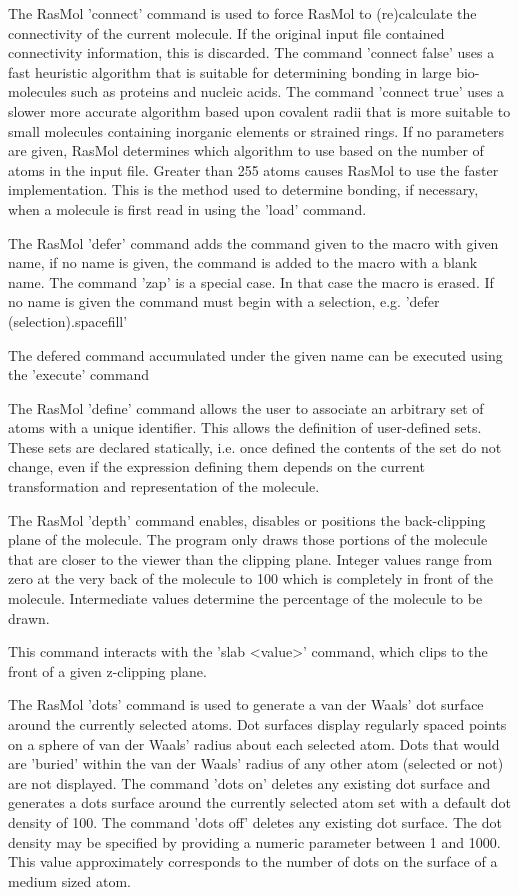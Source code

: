 The RasMol
'connect'
command is used to force RasMol to (re)calculate the connectivity
of the current molecule.
If the original input file contained connectivity information, this
is discarded. The command
'connect false'
uses a fast heuristic
algorithm that is suitable for determining bonding in large
bio-molecules such as proteins and nucleic acids. The command
'connect true'
uses a slower more accurate algorithm based upon
covalent radii that is more suitable to small molecules containing
inorganic elements or strained rings. If no parameters are given,
RasMol determines which algorithm to use based on the number of atoms
in the input file. Greater than 255 atoms causes RasMol to use the
faster implementation. This is the method used to determine bonding,
if necessary, when a molecule is first read in using the
'load'
command.

The RasMol
'defer'
command adds the command given to the macro with given name,
if no name is given, the command is added to the macro with a
blank name. The command
'zap'
is a special case. In that case the macro is erased. If no name is
given the command must begin with a selection, e.g.
'defer (selection).spacefill'

The defered command accumulated under the given name can be executed
using the
'execute'
command

The RasMol
'define'
command allows the user to associate an arbitrary set of atoms with a
unique identifier. This allows the definition of user-defined sets. These
sets are declared statically, i.e. once defined the contents of the set
do not change, even if the expression defining them depends on the
current transformation and representation of the molecule.

The RasMol
'depth'
command enables, disables or positions the back-clipping plane of the
molecule. The program only draws those portions of the
molecule that are closer to the viewer than the clipping plane.
Integer values range from zero at the very back of the molecule to
100 which is completely in front of the molecule. Intermediate values
determine the percentage of the molecule to be drawn.

This command interacts with the
'slab <value>'
command, which clips to the front of a given z-clipping plane.

The RasMol
'dots'
command is used to generate a van der Waals' dot surface around the
currently selected atoms. Dot surfaces display regularly spaced points
on a sphere of van der Waals' radius about each selected atom. Dots that
would are 'buried' within the van der Waals' radius of any other atom
(selected or not) are not displayed.
The command
'dots on'
deletes any existing dot surface and generates a dots surface around
the currently selected atom set with a default dot density of 100. The
command
'dots off'
deletes any existing dot surface. The dot density may be
specified by providing a numeric parameter between 1 and 1000. This
value approximately corresponds to the number of dots on the surface
of a medium sized atom.

